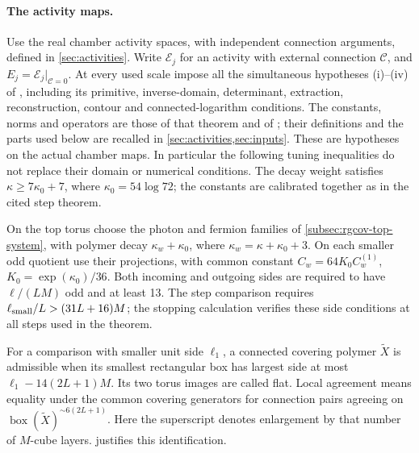 \paragraph{The activity maps.}
Use the real chamber activity spaces, with independent connection
arguments, defined in \cref{sec:activities}. Write \(\mathscr E_j\) for an activity
with external connection \(\mathscr C\), and \(E_j=\mathscr E_j|_{\mathscr C=0}\).
At every used scale impose all the simultaneous hypotheses
(i)--(iv) of \cite[Theorem~A]{NonlinearStep}, including its
primitive, inverse-domain, determinant, extraction, reconstruction,
contour and connected-logarithm conditions. The constants, norms and
operators are those of that theorem and of
\cite[Theorems~A--B]{NormalizedContraction}; their definitions and the
parts used below are recalled in \cref{sec:activities,sec:inputs}.
These are hypotheses on the actual chamber maps. In particular the
following tuning inequalities do not replace their domain or numerical
conditions. The decay weight satisfies \(\kappa\ge7\kappa_0+7\), where
\(\kappa_0=54\log72\); the constants are calibrated together as in the
cited step theorem.

On the top torus choose the photon and fermion families of
\cref{subsec:rgcov-top-system}, with polymer decay
\(\kappa_w+\kappa_0\), where \(\kappa_w=\kappa+\kappa_0+3\).
On each smaller odd quotient use their projections, with common
constant \(C_w=64K_0C_w^{(1)}\), \(K_0=\exp(\kappa_0)/36\).
Both incoming and outgoing sides are required to have
\(\ell/(LM)\) odd and at least 13. The step comparison requires
\(\ell_{\rm small}/L>(31L+16)M\); the stopping calculation verifies
these side conditions at all steps used in the theorem.

For a comparison with smaller unit side $\ell_1$, a connected
covering polymer $\widetilde X$ is admissible when its smallest
rectangular box has largest side at most $\ell_1-14(2L+1)M$.
Its two torus images are called flat. Local agreement means equality
under the common covering generators for connection pairs agreeing
on $\operatorname{box}(\widetilde X)^{\sim6(2L+1)}$.
Here the superscript denotes enlargement by that number of $M$-cube
layers.  justifies this identification.


